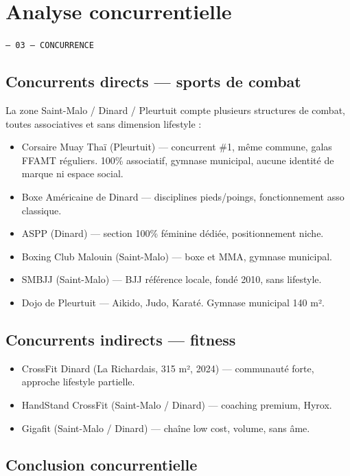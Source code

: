 \documentclass[11pt, a4paper]{article}
\newcommand{\eyebrow}[1]{%
  \vspace{4pt}
  {\small\color{fc-ink3}\texttt{— #1}}
  \vspace{2pt}
}
\begin{document}
\section{Analyse concurrentielle}
\eyebrow{03 — CONCURRENCE}

\subsection{Concurrents directs — sports de combat}

La zone Saint-Malo / Dinard / Pleurtuit compte plusieurs structures de combat, toutes associatives et sans dimension lifestyle :

\begin{itemize}
  \item Corsaire Muay Thaï (Pleurtuit) — concurrent \#1, même commune, galas FFAMT réguliers. 100\% associatif, gymnase municipal, aucune identité de marque ni espace social.
  \item Boxe Américaine de Dinard — disciplines pieds/poings, fonctionnement asso classique.
  \item ASPP (Dinard) — section 100\% féminine dédiée, positionnement niche.
  \item Boxing Club Malouin (Saint-Malo) — boxe et MMA, gymnase municipal.
  \item SMBJJ (Saint-Malo) — BJJ référence locale, fondé 2010, sans lifestyle.
  \item Dojo de Pleurtuit — Aikido, Judo, Karaté. Gymnase municipal 140 m².
\end{itemize}

\subsection{Concurrents indirects — fitness}

\begin{itemize}
  \item CrossFit Dinard (La Richardais, 315 m², 2024) — communauté forte, approche lifestyle partielle.
  \item HandStand CrossFit (Saint-Malo / Dinard) — coaching premium, Hyrox.
  \item Gigafit (Saint-Malo / Dinard) — chaîne low cost, volume, sans âme.
\end{itemize}

\subsection{Conclusion concurrentielle}
\end{document}
